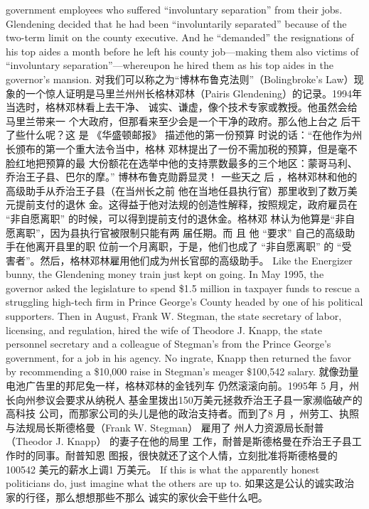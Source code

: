 \begin{paracol}{2}
government employees who suffered ``involuntary separation''
from their jobs. Glendening decided that he had been ``involuntarily separated'' because of the two-term limit on the county
executive. And he ``demanded'' the resignations of his top aides
a month before he left his county job---making them also victims of ``involuntary separation''---whereupon he hired them as
his top aides in the governor's mansion.
\switchcolumn
对我们可以称之为“博林布鲁克法则”（Bolingbroke’s Law）现象的一个惊人证明是马里兰州州长格林邓林（Pairis Glendening）的记录。1994年当选时，格林邓林看上去干净、
诚实、谦虚，像个技术专家或教授。他虽然会给马里兰带来一
个大政府，但那看来至少会是一个干净的政府。那么他上台之
后干了些什么呢？这 是 《华盛顿邮报》 描述他的第一份预算
时说的话：“在他作为州长颁布的第一个重大法令当中，格林
邓林提出了一份不需加税的预算，但是毫不脸红地把预算的最
大份额花在选举中他的支持票数最多的三个地区：蒙哥马利、
乔治王子县、巴尔的摩。” 博林布鲁克勋爵显灵！ 一些天之
后 ，格林邓林和他的高级助手从乔治王子县（在当州长之前
他在当地任县执行官）那里收到了数万美元提前支付的退休
金。这得益于他对法规的创造性解释，按照规定，政府雇员在
“非自愿离职” 的时候，可以得到提前支付的退休金。格林邓
林认为他算是“非自愿离职”，因为县执行官被限制只能有两
届任期。而 且 他 “要求” 自己的高级助手在他离开县里的职
位前一个月离职，于是，他们也成了 “非自愿离职” 的 “受
害者”。然后，格林邓林雇用他们成为州长官邸的高级助手。
\switchcolumn*
Like the Energizer bunny, the Glendening money train just
kept on going. In May 1995, the governor asked the legislature
to spend \$1.5 million in taxpayer funds to rescue a struggling
high-tech firm in Prince George's County headed by one of his
political supporters. Then in August, Frank W. Stegman, the
state secretary of labor, licensing, and regulation, hired the wife
of Theodore J. Knapp, the state personnel secretary and a colleague of Stegman's from the Prince George's government, for
a job in his agency. No ingrate, Knapp then returned the favor
by recommending a \$10,000 raise in Stegman's meager
\$100,542 salary.
\switchcolumn
就像劲量电池广告里的邦尼兔一样，格林邓林的金钱列车
仍然滚滚向前。1995年 5 月，州长向州参议会要求从纳税人
基金里拨出150万美元拯救乔治王子县一家濒临破产的高科技
公司，而那家公司的头儿是他的政治支持者。而到了8 月 ，州劳工、执照与法规局长斯德格曼（Frank W. Stegman） 雇用了
州人力资源局长耐普（Theodor J. Knapp） 的妻子在他的局里
工作，耐普是斯德格曼在乔治王子县工作时的同事。耐普知恩
图报，很快就还了这个人情，立刻批准将斯德格曼的100542
美元的薪水上调1 万美元。
\switchcolumn*
If this is what the apparently honest politicians do, just
imagine what the others are up to.
\switchcolumn
如果这是公认的诚实政治家的行径，那么想想那些不那么
诚实的家伙会干些什么吧。


\end{paracol}
